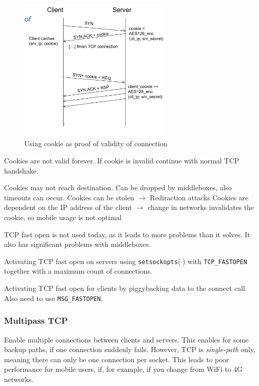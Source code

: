 \documentclass[english]{panikzettel}
\newcommand{\fkt}[1]{\texttt{#1}(\(\cdot\))}
\begin{document}
	\begin{figure}[H]
		\centering
		\includegraphics[width=0.65\textwidth]{img/1-tcp-fastopen-proof.png}
		\caption{Using cookie as proof of validity of connection}
		\label{img-1-tcp-fastopen-proof}
	\end{figure}

	Cookies are not valid forever. If cookie is invalid continue with normal TCP handshake.
	
	Cookies may not reach destination. 
	Can be dropped by middleboxes, also timeouts can occur.
	Cookies can be stolen \( \rightarrow \) Rediraction attacks 
	Cookies are dependent on the IP address of the client \( \rightarrow \) change in networks invalidates the cookie, so mobile usage is not optimal

	TCP fast open is not used today, as it leads to more problems than it solves.
	It also has significant problems with middleboxes.

	Activating TCP fast open on servers using \fkt{setsockopts} with \texttt{TCP\_FASTOPEN} together with a maximum count of connections.

	Activating TCP fast open for clients by piggybacking data to the connect call. 
	Also need to use \texttt{MSG\_FASTOPEN}.

	\subsubsection{Multipass TCP}
	\label{multipass-tcp}

	Enable multiple connections between clients and servers. 
	This enables for some backup paths, if one connection suddenly fails.
	However, TCP is \textit{single-path} only, meaning there can only be one connection per socket.
	This leads to poor performance for mobile users, if, for example, if you change from WiFi to 4G networks.
\end{document}
